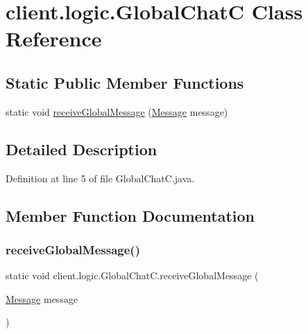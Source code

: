 \hypertarget{classclient_1_1logic_1_1_global_chat_c}{}\section{client.\+logic.\+Global\+ChatC Class Reference}
\label{classclient_1_1logic_1_1_global_chat_c}
\subsection*{Static Public Member Functions}
\begin{DoxyCompactItemize}
\item 
static void \hyperlink{classclient_1_1logic_1_1_global_chat_c_a74158167fb483ea7cec74151a49734cb}{receive\+Global\+Message} (\hyperlink{classpt_1_1up_1_1fe_1_1lpro1613_1_1sharedlib_1_1structs_1_1_message}{Message} message)
\end{DoxyCompactItemize}


\subsection{Detailed Description}


Definition at line 5 of file Global\+Chat\+C.\+java.



\subsection{Member Function Documentation}
\hypertarget{classclient_1_1logic_1_1_global_chat_c_a74158167fb483ea7cec74151a49734cb}{}\label{classclient_1_1logic_1_1_global_chat_c_a74158167fb483ea7cec74151a49734cb} 
\subsubsection{\texorpdfstring{receive\+Global\+Message()}{receiveGlobalMessage()}}
{\footnotesize\ttfamily static void client.\+logic.\+Global\+Chat\+C.\+receive\+Global\+Message (\begin{DoxyParamCaption}\item[{\hyperlink{classpt_1_1up_1_1fe_1_1lpro1613_1_1sharedlib_1_1structs_1_1_message}{Message}}]{message }\end{DoxyParamCaption})\hspace{0.3cm}{\ttfamily [static]}}

